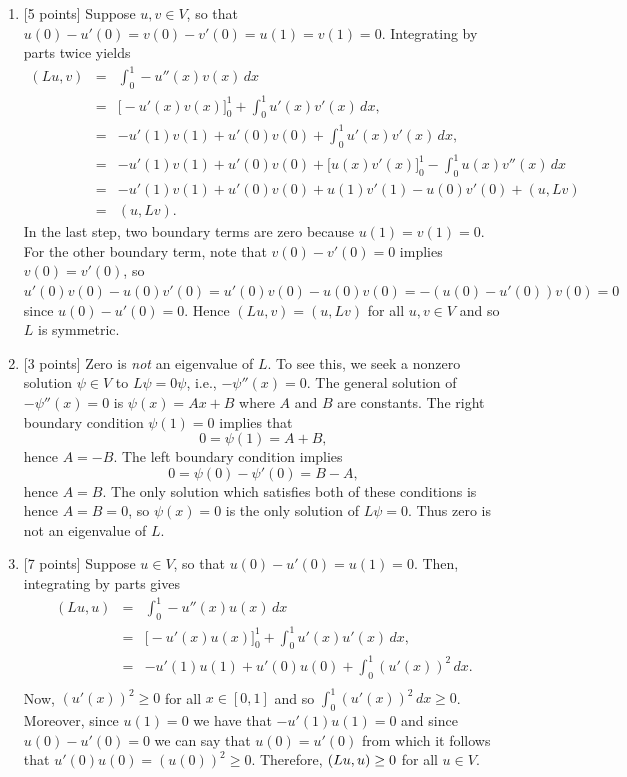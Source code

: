 \begin{solution}
\begin{enumerate}
\item {[5 points]} Suppose $u,v \in V$, so that $u(0)-u'(0)=v(0)-v'(0)=u(1)=v(1)=0.$
      Integrating by parts twice yields
\begin{eqnarray*}
 (Lu,v) &=& \int_0^1 -u''(x)v(x) \,dx \\[0.5em]
        &=& \Big[ -u'(x)v(x)\Big]_0^1 + \int_0^1 u'(x)v'(x)\,dx, \\[.5em]
        &=& -u'(1)v(1)+u'(0)v(0) + \int_0^1 u'(x)v'(x)\,dx,\\[.5em]
        &=& -u'(1)v(1)+u'(0)v(0) + \Big[ u(x)v'(x)\Big]_0^1 - \int_0^1 u(x)v''(x)\,dx\\[.5em]
        &=& -u'(1)v(1)+u'(0)v(0) + u(1)v'(1)-u(0)v'(0) + (u,Lv)\\[.5em]
        &=& (u,Lv).
\end{eqnarray*}
In the last step, two boundary terms are zero because $u(1)=v(1)=0$.
For the other boundary term, note that $v(0)-v'(0)=0$ implies $v(0)=v'(0)$,
so $u'(0)v(0) - u(0)v'(0) = u'(0)v(0) - u(0)v(0) = -(u(0)-u'(0))v(0) = 0$
since $u(0)-u'(0)=0$.  Hence $(Lu,v) = (u,Lv)$ for all $u,v \in V$ and so $L$ is symmetric.
\\
\item {[3 points]} Zero is \emph{not} an eigenvalue of $L$.  To see this, 
      we seek a nonzero solution $\psi\in V$ to $L\psi = 0 \psi$, i.e., $-\psi''(x) = 0$.
      The general solution of $-\psi''(x) = 0$ is $\psi(x) = A x + B$ where $A$ and $B$ are constants.
      The right boundary condition $\psi(1)=0$ implies that 
       \[ 0 = \psi(1) = A + B,\]
      hence $A = -B$.  The left boundary condition implies
       \[ 0 = \psi(0) - \psi'(0) = B - A,\]
      hence $A=B$.  The only solution which satisfies both of these conditions is hence
      $A=B=0$, so $\psi(x) = 0$ is the only solution 
      of $L\psi = 0$.
      Thus zero is not an eigenvalue of $L$.
\\
\item {[7 points]} Suppose $u\in V$, so that $u(0)-u'(0)=u(1)=0.$ Then, integrating by parts gives
\begin{eqnarray*}
 (Lu,u) &=& \int_0^1 -u''(x)u(x) \,dx \\[0.5em]
        &=& \Big[ -u'(x)u(x)\Big]_0^1 + \int_0^1  u'(x)u'(x)\,dx, \\[.5em]
        &=& -u'(1)u(1)+u'(0)u(0) + \int_0^1 (u'(x))^2\,dx.\\[.5em]
\end{eqnarray*}
Now, $(u'(x))^2\ge0$ for all $x\in[0,1]$ and so $\int_0^1 (u'(x))^2\,dx\ge0$. Moreover, since  $u(1)=0$ we have that $-u'(1)u(1)=0$ and since $u(0)-u'(0)=0$ we can say that $u(0)=u'(0)$ from which it follows that $u'(0)u(0)=(u(0))^2\ge0$. Therefore, $(Lu,u)\ge0$ for all $u\in V$.


\end{enumerate}
\end{solution}
